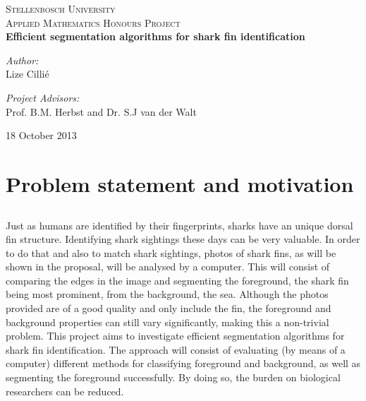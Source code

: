\documentclass[a4paper,10pt]{article}
\begin{document}
\begin{titlepage}
\begin{center}
\textsc{\LARGE Stellenbosch University}\\[1.5cm]

\textsc{\Large Applied Mathematics Honours Project}\\[0.5cm]

{ \huge \bfseries Efficient segmentation algorithms for shark fin
identification \\[0.4cm] }

\begin{minipage}{0.4\textwidth}
\begin{center} \large
\emph{Author:}\\
Lize Cilli\'{e}
\end{center}
\end{minipage}
\begin{minipage}{0.4\textwidth}
\begin{center} \large
\emph{Project Advisors:} \\
Prof. B.M. Herbst and Dr. S.J van der Walt
\end{center}
\end{minipage}

\vfill

\vspace{20mm}

18 October 2013
\end{center}

\end{titlepage}

\newpage
\tableofcontents

\newpage
\section{Problem statement and motivation}
\subsection{}
Just as humans are identified by their fingerprints, sharks have an unique
dorsal fin structure.  Identifying shark sightings these days can be very
valuable.  In order to do that and also to match shark sightings, photos of
shark fins, as will be shown in the proposal, will be analysed by a computer. 
This will consist of comparing the edges in the image and segmenting the
foreground, the shark fin being most prominent,  from the background, the sea. 
Although the photos provided are of a good quality and only include the fin, the
foreground and background properties can still vary significantly, making this a
non-trivial problem.  This project aims to investigate efficient segmentation
algorithms for shark fin identification.  The approach will consist of
evaluating (by means of a computer) different methods for classifying foreground
and background, as well as segmenting the foreground successfully.  By doing so,
the burden on biological researchers can be reduced.  \\
\end{document}

